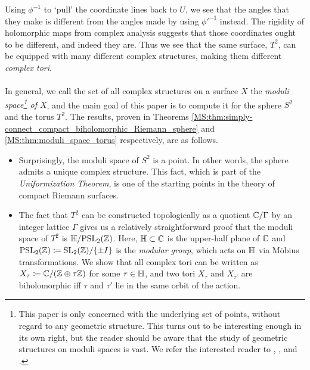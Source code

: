\documentclass[../Moduli_Spaces_of_Riemann_Surfaces.tex]{subfiles}
\begin{document}
    Using $\phi^{-1}$ to `pull' the coordinate lines back to $U$, we see that the angles that they make is different from the angles made by using $\phi'^{-1}$ instead. The rigidity of holomorphic maps from complex analysis suggests that those coordinates ought to be different, and indeed they are. Thus we see that the same surface, $T^2$, can be equipped with many different complex structures, making them different \textit{complex tori}.\\\ \\
    In general, we call the set of all complex structures on a surface $X$ the \textit{moduli space\footnote{This paper is only concerned with the underlying set of points, without regard to any geometric structure. This turns out to be interesting enough in its own right, but the reader should be aware that the study of geometric structures on moduli spaces is vast. We refer the interested reader to \cite{i&t}, \cite{farb}, and \cite{hubbard}.} of $X$}, and the main goal of this paper is to compute it for the sphere $S^2$ and the torus $T^2$. The results, proven in Theorems \ref{MS:thm:simply-connect_compact_biholomorphic_Riemann_sphere} and \ref{MS:thm:moduli_space_torus} respectively, are as follows.
    \begin{itemize}
        \item Surprisingly, the moduli space of $S^2$ is a point. In other words, the sphere admits a unique complex structure. This fact, which is part of the \textit{Uniformization Theorem}, is one of the starting points in the theory of compact Riemann surfaces.
            \vspace{-0.05in}
        \item The fact that $T^2$ can be constructed topologically as a quotient $\mathbb{C}/\Gamma$ by an integer lattice $\Gamma$ gives us a relatively straightforward proof that the moduli space of $T^2$ is $\mathbb{H}/\!\operatorname{PSL}_{2}\!\left(\mathbb{Z}\right)$. Here, $\mathbb{H}\subset\mathbb{C}$ is the upper-half plane of $\mathbb{C}$ and $\operatorname{PSL}_{2}\!\left(\mathbb{Z}\right)\coloneqq\operatorname{SL}_2\!\left(\mathbb{Z}\right)\!/\!\left\{\pm I\right\}$ is the \textit{modular group}, which acts on $\mathbb{H}$ via Möbius transformations. We show that all complex tori can be written as $X_\tau\coloneqq\mathbb{C}/\!\left(\mathbb{Z}\oplus\tau\mathbb{Z}\right)$ for some $\tau\in\mathbb{H}$, and two tori $X_\tau$ and $X_{\tau'}$ are biholomorphic iff $\tau$ and $\tau'$ lie in the same orbit of the action.
    \end{itemize}
\end{document}
